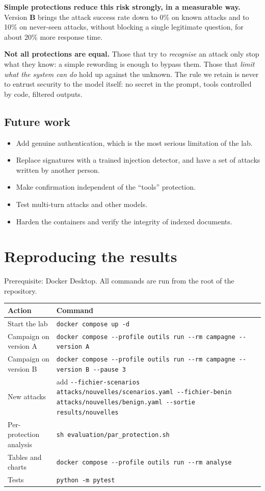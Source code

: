 \documentclass[11pt,a4paper]{article}
\newcommand{\pc}{\%}
\newcommand{\code}[1]{\texttt{#1}}
\newcommand{\vb}{\textcolor{vert}{\textbf{B}}}
\begin{document}
\textbf{Simple protections reduce this risk strongly, in a measurable way.} Version \vb{} brings the attack success rate down to 0\pc{} on known attacks and to 10\pc{} on never-seen attacks, without blocking a single legitimate question, for about 20\pc{} more response time.

\textbf{Not all protections are equal.} Those that try to \emph{recognise} an attack only stop what they know: a simple rewording is enough to bypass them. Those that \emph{limit what the system can do} hold up against the unknown. The rule we retain is never to entrust security to the model itself: no secret in the prompt, tools controlled by code, filtered outputs.

\subsection*{Future work}
\begin{itemize}
  \item Add genuine authentication, which is the most serious limitation of the lab.
  \item Replace signatures with a trained injection detector, and have a set of attacks written by another person.
  \item Make confirmation independent of the ``tools'' protection.
  \item Test multi-turn attacks and other models.
  \item Harden the containers and verify the integrity of indexed documents.
\end{itemize}

\appendix
\section{Reproducing the results}
\label{sec:annexe-commandes}

Prerequisite: Docker Desktop. All commands are run from the root of the repository.

\begin{tabularx}{\linewidth}{@{}P{5.2cm}Y@{}}
\toprule
\textbf{Action} & \textbf{Command} \\
\midrule
Start the lab & \code{docker compose up -d} \\
Campaign on version A & \code{docker compose -{}-profile outils run -{}-rm campagne -{}-version A} \\
Campaign on version B & \code{docker compose -{}-profile outils run -{}-rm campagne -{}-version B -{}-pause 3} \\
New attacks & add \code{-{}-fichier-scenarios attacks/nouvelles/scenarios.yaml -{}-fichier-benin attacks/nouvelles/benign.yaml -{}-sortie results/nouvelles} \\
Per-protection analysis & \code{sh evaluation/par\_protection.sh} \\
Tables and charts & \code{docker compose -{}-profile outils run -{}-rm analyse} \\
Tests & \code{python -m pytest} \\
\bottomrule
\end{tabularx}
\end{document}
